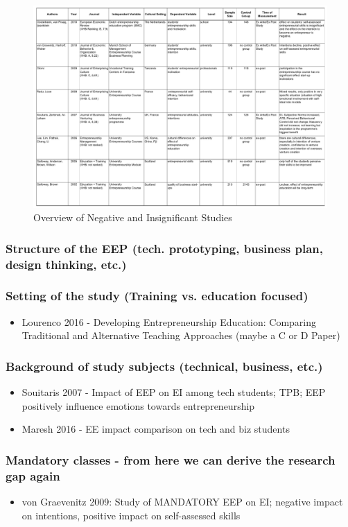 \begin{figure}[h]
\begin{center}
\includegraphics[width=\textwidth]{images/table-negative-impact}
\caption{Overview of Negative and Insignificant Studies}
\label{fig:table-negative-impact}
\end{center}
\end{figure}

\subsubsection{Structure of the EEP (tech. prototyping, business plan, design thinking, etc.)}

\subsubsection{Setting of the study (Training vs. education focused)}

\begin{itemize}
\item Lourenco 2016 - Developing Entrepreneurship Education: Comparing Traditional and Alternative Teaching Approaches (maybe a C or D Paper)
\end{itemize}

\subsubsection{Background of study subjects (technical, business, etc.)}

\begin{itemize}
\item Souitaris 2007 - Impact of EEP on EI among tech students; TPB; EEP positively influence emotions towards entrepreneurship
\item Maresh 2016 - EE impact comparison on tech and biz students
\end{itemize}

\subsubsection{Mandatory classes - from here we can derive the research gap again}
\begin{itemize}
\item von Graevenitz 2009: Study of MANDATORY EEP on EI; negative impact on intentions, positive impact on self-assessed skills
\end{itemize}